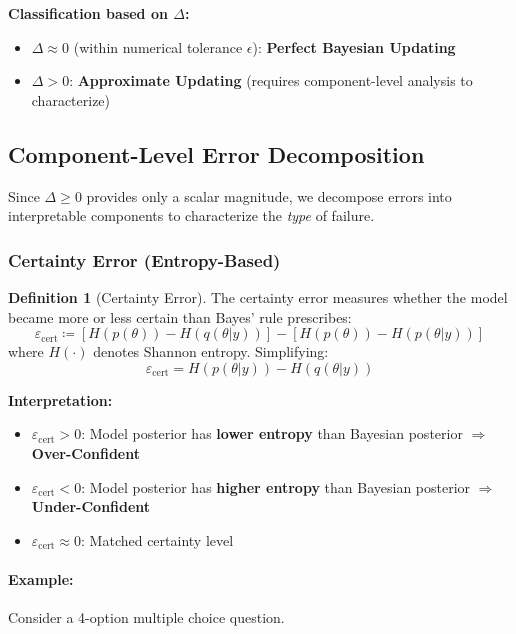 \documentclass{article}
\theoremstyle{definition}
\newtheorem{definition}{Definition}
\begin{document}
\textbf{Classification based on $\Delta$:}
\begin{itemize}
    \item $\Delta \approx 0$ (within numerical tolerance $\epsilon$): \textbf{Perfect Bayesian Updating}
    \item $\Delta > 0$: \textbf{Approximate Updating} (requires component-level analysis to characterize)
\end{itemize}

\subsection{Component-Level Error Decomposition}

Since $\Delta \geq 0$ provides only a scalar magnitude, we decompose errors into interpretable components to characterize the \emph{type} of failure.

\subsubsection{Certainty Error (Entropy-Based)}

\begin{definition}[Certainty Error]
The certainty error measures whether the model became more or less certain than Bayes' rule prescribes:
\begin{equation}
\varepsilon_{\text{cert}} \coloneqq [H(p(\theta)) - H(q(\theta|y))] - [H(p(\theta)) - H(p(\theta|y))]
\end{equation}
where $H(\cdot)$ denotes Shannon entropy. Simplifying:
\begin{equation}
\varepsilon_{\text{cert}} = H(p(\theta|y)) - H(q(\theta|y))
\end{equation}
\end{definition}

\textbf{Interpretation:}
\begin{itemize}
    \item $\varepsilon_{\text{cert}} > 0$: Model posterior has \textbf{lower entropy} than Bayesian posterior $\Rightarrow$ \textbf{Over-Confident}
    \item $\varepsilon_{\text{cert}} < 0$: Model posterior has \textbf{higher entropy} than Bayesian posterior $\Rightarrow$ \textbf{Under-Confident}
    \item $\varepsilon_{\text{cert}} \approx 0$: Matched certainty level
\end{itemize}

\paragraph{Example:} Consider a 4-option multiple choice question.
\end{document}
